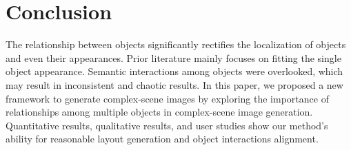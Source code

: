 \section{Conclusion}
The relationship between objects significantly rectifies the localization of objects and even their appearances. Prior literature mainly focuses on fitting the single object appearance. Semantic interactions among objects were overlooked, which may result in inconsistent and chaotic results. In this paper, we proposed a new framework to generate complex-scene images %
by exploring the importance of relationships among multiple objects in complex-scene image generation. Quantitative results, qualitative results, and user studies show our method's ability for reasonable layout generation and object interactions alignment.%
